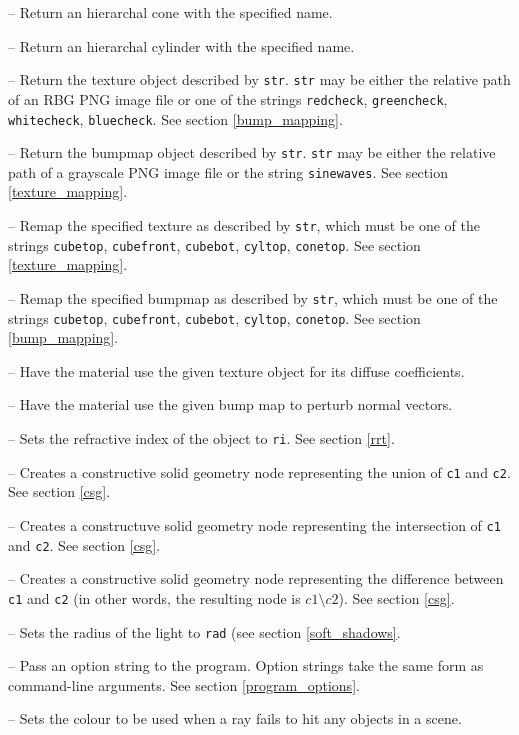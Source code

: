 \documentclass{article}
\begin{document}
\begin{itemize}

   -- Return an hierarchal cone with the specified name.

   -- Return an hierarchal cylinder with the
  specified name.

   -- Return the texture object described by {\tt str}.
  {\tt str} may be either the relative path of an RBG PNG image file or one of the
  strings {\tt redcheck}, {\tt greencheck}, {\tt whitecheck}, {\tt bluecheck}. See section
  \ref{bump_mapping}.

   -- Return the bumpmap object described by {\tt str}.
  {\tt str} may be either the relative path of a grayscale PNG image file or the
  string {\tt sinewaves}. See section \ref{texture_mapping}.

   -- Remap the specified texture as described by
  {\tt str}, which must be one of the strings {\tt cubetop}, {\tt cubefront}, {\tt cubebot},
  {\tt cyltop}, {\tt conetop}. See section \ref{texture_mapping}.

   -- Remap the specified bumpmap as described by
  {\tt str}, which must be one of the strings {\tt cubetop}, {\tt cubefront},
  {\tt cubebot},
  {\tt cyltop}, {\tt conetop}. See section \ref{bump_mapping}.

   -- Have the material use the given
  texture object for its diffuse coefficients.

   -- Have the material use the given
  bump map to perturb normal vectors.

   -- Sets the refractive index of the object to
  {\tt ri}. See section \ref{rrt}.

   -- Creates a constructive solid geometry node representing
  the union of {\tt c1} and {\tt c2}. See section \ref{csg}.

   -- Creates a constructuve solid geometry node
  representing the intersection of {\tt c1} and {\tt c2}. See section
  \ref{csg}.

   -- Creates a constructive solid geometry node
  representing the difference between {\tt c1} and {\tt c2} (in other words, the
  resulting node is $c1 \setminus c2$). See section
  \ref{csg}.

   -- Sets the radius of the light to {\tt rad} (see
  section \ref{soft_shadows}.

   -- Pass an option string to the program. Option strings
  take the same form as command-line arguments. See section
  \ref{program_options}.

   -- Sets the colour to be used when a
  ray fails to hit any objects in a scene.

\end{itemize}
\end{document}
